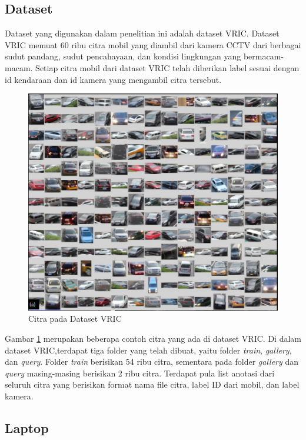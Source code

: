 \subsection{Dataset}

Dataset yang digunakan dalam penelitian ini adalah dataset VRIC. Dataset VRIC memuat 
60 ribu citra mobil yang diambil dari kamera CCTV dari berbagai sudut pandang, sudut 
pencahayaan, dan kondisi lingkungan yang bermacam-macam. Setiap citra mobil dari dataset 
VRIC telah diberikan label sesuai dengan id kendaraan dan id kamera yang mengambil 
citra tersebut.

\begin{figure}[ht]
  \centering
  \includegraphics[scale=0.55]{gambar/VRICcontoh.png}
  \caption{Citra pada Dataset VRIC}
  \label{fig:citrapadadatasetvric}
\end{figure}

Gambar \ref{fig:citrapadadatasetvric} merupakan beberapa contoh citra yang ada di dataset 
VRIC. Di dalam dataset VRIC,terdapat tiga folder yang telah dibuat, yaitu folder \emph{train}, 
\emph{gallery}, dan \emph{query}. Folder \emph{train} berisikan 54 
ribu citra, sementara pada folder \emph{gallery} dan \emph{query} masing-masing 
berisikan 2 ribu citra. Terdapat pula list anotasi dari seluruh citra yang berisikan 
format nama file citra, label ID dari mobil, dan label kamera.

\subsection{Laptop}

